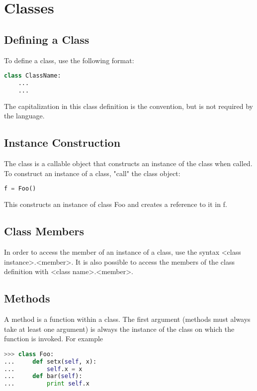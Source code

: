 \section{Classes}
\subsection{Defining a Class}
To define a class, use the following format:
\lstset{basicstyle=\scriptsize, numbers=left, captionpos=b, tabsize=4}
\begin{lstlisting}[caption=Class Definition,language={Python},
xleftmargin=15pt, label=lst:classdefinition]
class ClassName:
    ...
    ...
\end{lstlisting}

The capitalization in this class definition is the convention, but is not
required by the language.

\subsection{Instance Construction}
The class is a callable object that constructs an instance of the class when
called. To construct an instance of a class, "call" the class object:
\lstset{basicstyle=\scriptsize, numbers=left, captionpos=b, tabsize=4}
\begin{lstlisting}[caption=Instancing a Class,language={Python},
xleftmargin=15pt, label=lst:instancingaclass]
f = Foo()
\end{lstlisting}

This constructs an instance of class Foo and creates a reference to it in f.

\subsection{Class Members}
In order to access the member of an instance of a class, use the syntax <class
instance>.<member>. It is also possible to access the members of the class
definition with <class name>.<member>.

\subsection{Methods}
A method is a function within a class. The first argument (methods must always
take at least one argument) is always the instance of the class on which the
function is invoked. For example
\lstset{basicstyle=\scriptsize, numbers=left, captionpos=b, tabsize=4}
\begin{lstlisting}[caption=Defining member Functions,language={Python},
xleftmargin=15pt, label=lst:definigmemberfunctions]
>>> class Foo:
...     def setx(self, x):
...         self.x = x
...     def bar(self):
...         print self.x
\end{lstlisting}

